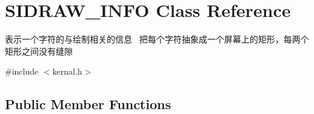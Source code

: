 \hypertarget{class_s_i_d_r_a_w___i_n_f_o}{}\section{S\+I\+D\+R\+A\+W\+\_\+\+I\+N\+FO Class Reference}
\label{class_s_i_d_r_a_w___i_n_f_o}


表示一个字符的与绘制相关的信息~\newline
把每个字符抽象成一个屏幕上的矩形，每两个矩形之间没有缝隙  




{\ttfamily \#include $<$kernal.\+h$>$}

\subsection*{Public Member Functions}
